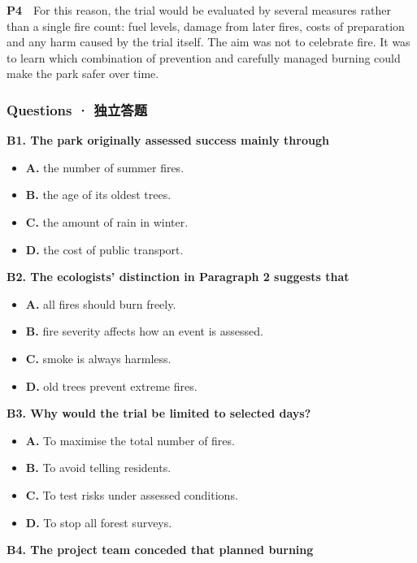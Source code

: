 \documentclass[
  11pt,
]{ctexart}
\begin{document}
\textbf{P4}　For this reason, the trial would be evaluated by several
measures rather than a single fire count: fuel levels, damage from later
fires, costs of preparation and any harm caused by the trial itself. The
aim was not to celebrate fire. It was to learn which combination of
prevention and carefully managed burning could make the park safer over
time.

\subsubsection{Questions ·
独立答题}\label{questions-ux72ecux7acbux7b54ux9898-1}

\textbf{B1. The park originally assessed success mainly through}

\begin{itemize}
\item
  \textbf{A.} the number of summer fires.
\item
  \textbf{B.} the age of its oldest trees.
\item
  \textbf{C.} the amount of rain in winter.
\item
  \textbf{D.} the cost of public transport.
\end{itemize}

\textbf{B2. The ecologists' distinction in Paragraph 2 suggests that}

\begin{itemize}
\item
  \textbf{A.} all fires should burn freely.
\item
  \textbf{B.} fire severity affects how an event is assessed.
\item
  \textbf{C.} smoke is always harmless.
\item
  \textbf{D.} old trees prevent extreme fires.
\end{itemize}

\textbf{B3. Why would the trial be limited to selected days?}

\begin{itemize}
\item
  \textbf{A.} To maximise the total number of fires.
\item
  \textbf{B.} To avoid telling residents.
\item
  \textbf{C.} To test risks under assessed conditions.
\item
  \textbf{D.} To stop all forest surveys.
\end{itemize}

\textbf{B4. The project team conceded that planned burning}
\end{document}
